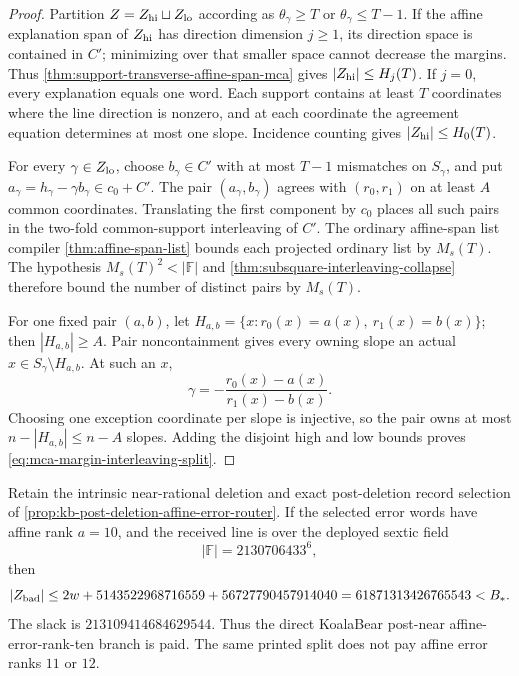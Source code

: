 \documentclass[11pt,a4paper]{amsart}
\numberwithin{equation}{section}
\theoremstyle{remark}
\newcommand{\F}{\mathbb F}\newcommand{\B}{\mathbb B}\newcommand{\K}{\mathbb K}\newcommand{\Z}{\mathbb Z}
\begin{document}
\begin{proof}
Partition \(Z=Z_{\rm hi}\sqcup Z_{\rm lo}\) according as
\(\theta_\gamma\geq T\) or \(\theta_\gamma\leq T-1\).
If the affine explanation span of \(Z_{\rm hi}\) has direction dimension
\(j\geq1\), its direction space is contained in \(C'\); minimizing over
that smaller space cannot decrease the margins.  Thus
\cref{thm:support-transverse-affine-span-mca} gives
\(|Z_{\rm hi}|\leq H_j(T)\).  If \(j=0\), every explanation equals one
word.  Each support contains at least \(T\) coordinates where the line
direction is nonzero, and at each coordinate the agreement equation
determines at most one slope.  Incidence counting gives
\(|Z_{\rm hi}|\leq H_0(T)\).

For every \(\gamma\in Z_{\rm lo}\), choose \(b_\gamma\in C'\) with at
most \(T-1\) mismatches on \(S_\gamma\), and put
\(a_\gamma=h_\gamma-\gamma b_\gamma\in c_0+C'\).  The pair
\((a_\gamma,b_\gamma)\) agrees with \((r_0,r_1)\) on at least \(A\)
common coordinates.  Translating the first component by \(c_0\) places
all such pairs in the two-fold common-support interleaving of \(C'\).
The ordinary affine-span list compiler
\cref{thm:affine-span-list} bounds each projected ordinary list by
\(M_s(T)\).  The hypothesis \(M_s(T)^2<|\F|\) and
\cref{thm:subsquare-interleaving-collapse} therefore bound the number of
distinct pairs by \(M_s(T)\).

For one fixed pair \((a,b)\), let
\(H_{a,b}=\{x:r_0(x)=a(x),\ r_1(x)=b(x)\}\); then
\(|H_{a,b}|\geq A\).  Pair noncontainment gives every owning slope an
actual \(x\in S_\gamma\setminus H_{a,b}\).  At such an \(x\),
\[
 \gamma=-\frac{r_0(x)-a(x)}{r_1(x)-b(x)}.
\]
Choosing one exception coordinate per slope is injective, so the pair
owns at most \(n-|H_{a,b}|\leq n-A\) slopes.  Adding the disjoint high and
low bounds proves \eqref{eq:mca-margin-interleaving-split}.
\end{proof}

\begin{proposition}
\label{prop:kb-affine-error-rank-ten-payment}
Retain the intrinsic near-rational deletion and exact post-deletion record
selection of \cref{prop:kb-post-deletion-affine-error-router}.  If the
selected error words have affine rank \(a=10\), and the received line is
over the deployed sextic field
\[
 |\F|=2130706433^6,
\]
then
\[
 |Z_{\rm bad}|\leq
 2w+5143522968716559+56727790457914040
 =61871313426765543<B_*.
\]
The slack is \(213109414684629544\).  Thus the direct KoalaBear
post-near affine-error-rank-ten branch is paid.  The same printed split
does not pay affine error ranks \(11\) or \(12\).
\end{proposition}
\end{document}
